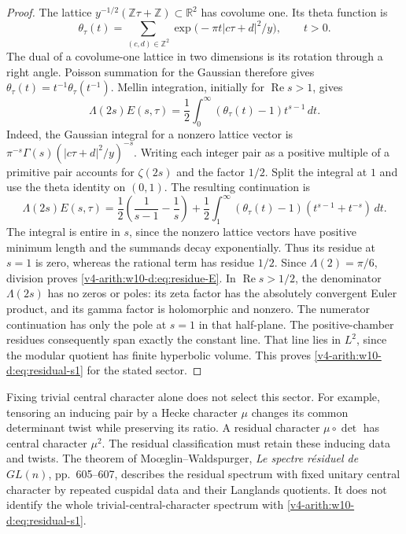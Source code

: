 \begin{proof}
The lattice $y^{-1/2}(\mathbb Z\tau+\mathbb Z)\subset\mathbb R^2$
has covolume one. Its theta function is
\[
 \theta_\tau(t)=\sum_{(c,d)\in\mathbb Z^2}
  \exp\bigl(-\pi t|c\tau+d|^2/y\bigr),\qquad t>0.
\]
The dual of a covolume-one lattice in two dimensions is its rotation
through a right angle. Poisson summation for the Gaussian therefore gives
$\theta_\tau(t)=t^{-1}\theta_\tau(t^{-1})$.
Mellin integration, initially for $\operatorname{Re}s>1$, gives
\[
 \Lambda(2s)E(s,\tau)
 =\frac12\int_0^\infty(\theta_\tau(t)-1)t^{s-1}\,dt.
\]
Indeed, the Gaussian integral for a nonzero lattice vector is
$\pi^{-s}\Gamma(s)(|c\tau+d|^2/y)^{-s}$.
Writing each integer pair as a positive multiple of a primitive pair
accounts for $\zeta(2s)$ and the factor $1/2$.
Split the integral at $1$ and use the theta identity on $(0,1)$.
The resulting continuation is
\[
 \Lambda(2s)E(s,\tau)
 =\frac12\left(\frac1{s-1}-\frac1s\right)
 +\frac12\int_1^\infty(\theta_\tau(t)-1)
             (t^{s-1}+t^{-s})\,dt.
\]
The integral is entire in $s$, since the nonzero lattice vectors have
positive minimum length and the summands decay exponentially.
Thus its residue at $s=1$ is zero, whereas the rational term has
residue $1/2$. Since $\Lambda(2)=\pi/6$, division proves
\eqref{v4-arith:w10-d:eq:residue-E}. In $\operatorname{Re}s>1/2$, the denominator $\Lambda(2s)$
has no zeros or poles: its zeta factor has the absolutely convergent
Euler product, and its gamma factor is holomorphic and nonzero.
The numerator continuation has only the pole at $s=1$ in that half-plane.
The positive-chamber residues consequently span exactly the constant line. That line lies in
$L^2$, since the modular quotient has finite hyperbolic volume.
This proves \eqref{v4-arith:w10-d:eq:residual-s1} for the stated sector.
\end{proof}

Fixing trivial central character alone does not select this sector.
For example, tensoring an inducing pair by a Hecke character $\mu$
changes its common determinant twist while preserving its ratio.
A residual character $\mu\circ\det$ has central character $\mu^2$.
The residual classification must retain these inducing data and twists.
The theorem of Mo{\oe}glin--Waldspurger, \emph{Le spectre r\'esiduel de
$GL(n)$}, pp.~605--607, describes the residual spectrum with fixed unitary
central character by repeated cuspidal data and their Langlands quotients.
It does not identify the whole trivial-central-character spectrum with
\eqref{v4-arith:w10-d:eq:residual-s1}.

